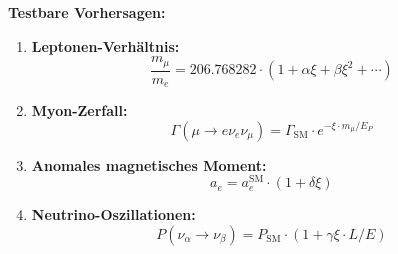	\begin{anwendung}
		\textbf{Testbare Vorhersagen:}
		
		\begin{enumerate}
			\item \textbf{Leptonen-Verhältnis:}
			\begin{equation}
				\frac{m_\mu}{m_e} = 206.768282 \cdot (1 + \alpha \xi + \beta \xi^2 + \cdots)
			\end{equation}
			
			\item \textbf{Myon-Zerfall:}
			\begin{equation}
				\Gamma(\mu \to e\nu_e\nu_\mu) = \Gamma_{\text{SM}} \cdot e^{-\xi \cdot m_\mu/E_P}
			\end{equation}
			
			\item \textbf{Anomales magnetisches Moment:}
			\begin{equation}
				a_e = a_e^{\text{SM}} \cdot (1 + \delta \xi)
			\end{equation}
			
			\item \textbf{Neutrino-Oszillationen:}
			\begin{equation}
				P(\nu_\alpha \to \nu_\beta) = P_{\text{SM}} \cdot (1 + \gamma \xi \cdot L/E)
			\end{equation}
		\end{enumerate}
	\end{anwendung}
	